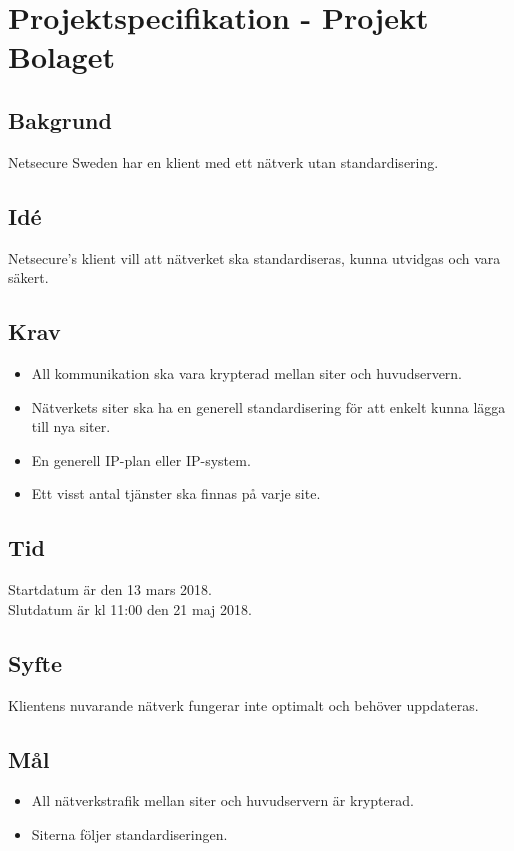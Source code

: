 \section*{Projektspecifikation - Projekt Bolaget}
\subsection*{Bakgrund}
Netsecure Sweden har en klient med ett nätverk utan standardisering.

\subsection*{Idé}
Netsecure's klient vill att nätverket ska standardiseras, kunna utvidgas och vara säkert.

\subsection*{Krav}
\begin{itemize}
    \item All kommunikation ska vara krypterad mellan siter och huvudservern.
    \item Nätverkets siter ska ha en generell standardisering för att enkelt kunna lägga till nya siter.
    \item En generell IP-plan eller IP-system.
    \item Ett visst antal tjänster ska finnas på varje site.
\end{itemize}

\subsection*{Tid}
Startdatum är den 13 mars 2018. \\
Slutdatum är kl 11:00 den 21 maj 2018.

\subsection*{Syfte}
Klientens nuvarande nätverk fungerar inte optimalt och behöver uppdateras.

\subsection*{Mål}
\begin{itemize}
    \item All nätverkstrafik mellan siter och huvudservern är krypterad.
    \item Siterna följer standardiseringen.
\end{itemize}

